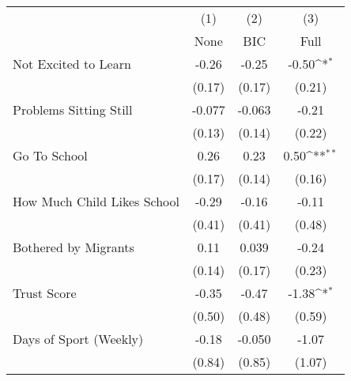 {
\def\sym#1{\ifmmode^{#1}\else\(^{#1}\)\fi}
\begin{tabular}{l*{3}{c}}
\toprule
            &\multicolumn{1}{c}{(1)}&\multicolumn{1}{c}{(2)}&\multicolumn{1}{c}{(3)}\\
            &\multicolumn{1}{c}{None}&\multicolumn{1}{c}{BIC}&\multicolumn{1}{c}{Full}\\
\midrule
Not Excited to Learn&       -0.26         &       -0.25         &       -0.50\sym{*}  \\
            &      (0.17)         &      (0.17)         &      (0.21)         \\
\addlinespace
Problems Sitting Still&      -0.077         &      -0.063         &       -0.21         \\
            &      (0.13)         &      (0.14)         &      (0.22)         \\
\addlinespace
Go To School&        0.26         &        0.23         &        0.50\sym{**} \\
            &      (0.17)         &      (0.14)         &      (0.16)         \\
\addlinespace
How Much Child Likes School&       -0.29         &       -0.16         &       -0.11         \\
            &      (0.41)         &      (0.41)         &      (0.48)         \\
\addlinespace
Bothered by Migrants&        0.11         &       0.039         &       -0.24         \\
            &      (0.14)         &      (0.17)         &      (0.23)         \\
\addlinespace
Trust Score &       -0.35         &       -0.47         &       -1.38\sym{*}  \\
            &      (0.50)         &      (0.48)         &      (0.59)         \\
\addlinespace
Days of Sport (Weekly)&       -0.18         &      -0.050         &       -1.07         \\
            &      (0.84)         &      (0.85)         &      (1.07)         \\
\bottomrule
\end{tabular}
}
